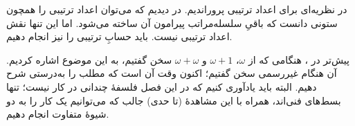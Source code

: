\documentclass[../../../include/open-logic-section]{subfiles}
\begin{document}


در  نظریه‌ای برای اعداد ترتیبی پروراندیم.
در  دیدیم که می‌توان اعداد ترتیبی را همچون
ستونی دانست که باقیِ سلسله‌مراتب پیرامون آن ساخته می‌شود. اما این
تنها نقش اعداد ترتیبی نیست. باید حسابِ ترتیبی را نیز انجام دهیم.

پیش‌تر در ، هنگامی که از $\omega$،
$\omega+1$ و $\omega+\omega$ سخن گفتیم، به این موضوع اشاره کردیم.
آن هنگام غیررسمی سخن گفتیم؛ اکنون وقت آن است که مطلب را به‌درستی
شرح دهیم. البته باید یادآوری کنیم که در این فصل فلسفهٔ چندانی در
کار نیست؛ تنها بسط‌های فنی‌اند، همراه با این مشاهدهٔ (تا حدی) جالب
که می‌توانیم یک کار را به دو شیوهٔ متفاوت انجام دهیم.
\end{document}
